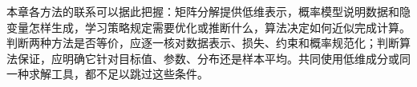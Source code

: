 本章各方法的联系可以据此把握：矩阵分解提供低维表示，概率模型说明数据和隐变量怎样生成，学习策略规定需要优化或推断什么，算法决定如何近似完成计算。判断两种方法是否等价，应逐一核对数据表示、损失、约束和概率规范化；判断算法保证，应明确它针对目标值、参数、分布还是样本平均。共同使用低维成分或同一种求解工具，都不足以跳过这些条件。






